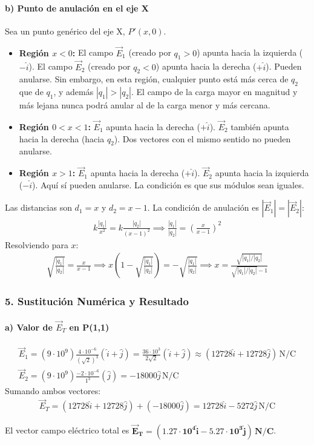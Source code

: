 \paragraph*{b) Punto de anulación en el eje X}
Sea un punto genérico del eje X, $P'(x,0)$.
\begin{itemize}
    \item \textbf{Región $x<0$:} El campo $\vec{E}_1$ (creado por $q_1>0$) apunta hacia la izquierda ($-\hat{i}$). El campo $\vec{E}_2$ (creado por $q_2<0$) apunta hacia la derecha ($+\hat{i}$). Pueden anularse. Sin embargo, en esta región, cualquier punto está más cerca de $q_2$ que de $q_1$, y además $|q_1|>|q_2|$. El campo de la carga mayor en magnitud y más lejana nunca podrá anular al de la carga menor y más cercana.
    \item \textbf{Región $0<x<1$:} $\vec{E}_1$ apunta hacia la derecha ($+\hat{i}$). $\vec{E}_2$ también apunta hacia la derecha (hacia $q_2$). Dos vectores con el mismo sentido no pueden anularse.
    \item \textbf{Región $x>1$:} $\vec{E}_1$ apunta hacia la derecha ($+\hat{i}$). $\vec{E}_2$ apunta hacia la izquierda ($-\hat{i}$). Aquí sí pueden anularse. La condición es que sus módulos sean iguales.
\end{itemize}
Las distancias son $d_1 = x$ y $d_2 = x-1$. La condición de anulación es $|\vec{E}_1| = |\vec{E}_2|$:
\begin{gather}
    k \frac{|q_1|}{x^2} = k \frac{|q_2|}{(x-1)^2} \implies \frac{|q_1|}{|q_2|} = \left(\frac{x}{x-1}\right)^2
\end{gather}
Resolviendo para $x$:
\begin{gather}
    \sqrt{\frac{|q_1|}{|q_2|}} = \frac{x}{x-1} \implies x \left(1-\sqrt{\frac{|q_1|}{|q_2|}}\right) = - \sqrt{\frac{|q_1|}{|q_2|}} \implies x = \frac{\sqrt{|q_1|/|q_2|}}{\sqrt{|q_1|/|q_2|}-1}
\end{gather}

\subsubsection*{5. Sustitución Numérica y Resultado}
\paragraph*{a) Valor de $\vec{E}_T$ en P(1,1)}
\begin{gather}
    \vec{E}_1 = (9 \cdot 10^9) \frac{4 \cdot 10^{-6}}{(\sqrt{2})^3} (\hat{i} + \hat{j}) = \frac{36 \cdot 10^3}{2\sqrt{2}}(\hat{i} + \hat{j}) \approx (12728\hat{i} + 12728\hat{j}) \, \text{N/C} \\
    \vec{E}_2 = (9 \cdot 10^9) \frac{-2 \cdot 10^{-6}}{1^3} (\hat{j}) = -18000\hat{j} \, \text{N/C}
\end{gather}
Sumando ambos vectores:
\begin{gather}
    \vec{E}_T = (12728\hat{i} + 12728\hat{j}) + (-18000\hat{j}) = 12728\hat{i} - 5272\hat{j} \, \text{N/C}
\end{gather}
\begin{cajaresultado}
    El vector campo eléctrico total es $\boldsymbol{\vec{E}_T = (1.27 \cdot 10^4 \hat{i} - 5.27 \cdot 10^3 \hat{j}) \, \textbf{N/C}}$.
\end{cajaresultado}

